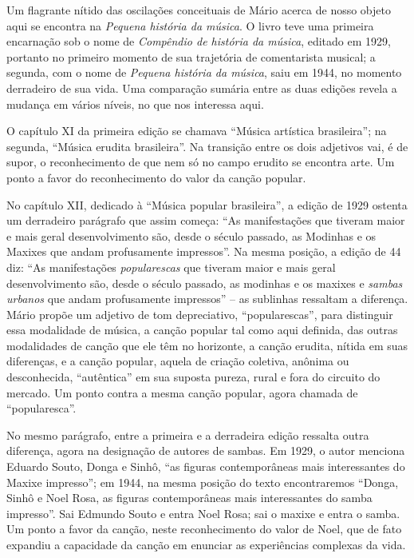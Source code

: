 Um flagrante nítido das oscilações conceituais de Mário acerca de nosso
objeto aqui se encontra na \emph{Pequena história da música}. O livro
teve uma primeira encarnação sob o nome de \emph{Compêndio de história
da música}, editado em 1929, portanto no primeiro momento de sua
trajetória de comentarista musical; a segunda, com o nome de
\emph{Pequena história da música}, saiu em 1944, no momento derradeiro
de sua vida. Uma comparação sumária entre as duas edições revela a
mudança em vários níveis, no que nos interessa aqui.

O capítulo XI da primeira edição se chamava ``Música artística
brasileira''; na segunda, ``Música erudita brasileira''. Na transição
entre os dois adjetivos vai, é de supor, o reconhecimento de que nem só
no campo erudito se encontra arte. Um ponto a favor do reconhecimento do
valor da canção popular.

No capítulo XII, dedicado à ``Música popular brasileira'', a edição de
1929 ostenta um derradeiro parágrafo que assim começa: ``As
manifestações
\protect\hypertarget{kix.97myr1x2v846}{}{\protect\hypertarget{kix.1bsudeaoz0pn}{}{}}que
tiveram maior e mais geral desenvolvimento são, desde o século passado,
as Modinhas e os Maxixes que andam profusamente impressos''. Na mesma
posição, a edição de 44 diz: ``As manifestações \emph{popularescas} que
tiveram maior e mais geral desenvolvimento são, desde o século passado,
as modinhas e os maxixes e \emph{sambas urbanos} que andam profusamente
impressos'' -- as sublinhas ressaltam a diferença. Mário propõe um
adjetivo de tom depreciativo, ``popularescas'', para distinguir essa
modalidade de música, a canção popular tal como aqui definida, das
outras modalidades de canção que ele têm no horizonte, a canção erudita,
nítida em suas diferenças, e a canção popular, aquela de criação
coletiva, anônima ou desconhecida, ``autêntica'' em sua suposta pureza,
rural e fora do circuito do mercado. Um ponto contra a mesma canção
popular, agora chamada de ``popularesca''.

No mesmo parágrafo, entre a primeira e a derradeira edição ressalta
outra diferença, agora na designação de autores de sambas. Em 1929, o
autor menciona Eduardo Souto, Donga e Sinhô, ``as figuras contemporâneas
mais interessantes do Maxixe impresso''; em 1944, na mesma posição do
texto encontraremos ``Donga, Sinhô e Noel Rosa, as figuras
contemporâneas mais interessantes do samba impresso''. Sai Edmundo Souto
e entra Noel Rosa; sai o maxixe e entra o samba. Um ponto a favor da
canção, neste reconhecimento do valor de Noel, que de fato expandiu a
capacidade da canção em enunciar as experiências complexas da vida.

